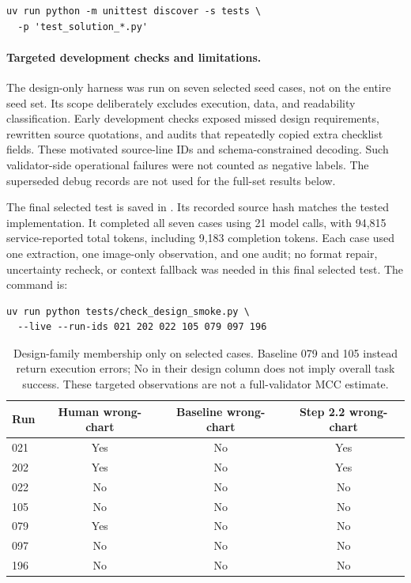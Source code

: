 \documentclass[11pt]{article}
\begin{document}
\begin{verbatim}
uv run python -m unittest discover -s tests \
  -p 'test_solution_*.py'
\end{verbatim}

\paragraph{Targeted development checks and limitations.}
The design-only harness  was run on seven
selected seed cases, not on the entire seed set. Its scope deliberately
excludes execution, data, and readability classification.
Early development checks exposed missed design requirements, rewritten source
quotations, and audits that repeatedly copied extra checklist fields.
These motivated source-line IDs and schema-constrained decoding.
Such validator-side operational failures were not counted as negative labels.
The superseded debug records are not used for the full-set results below.

The final selected test is saved in
.
Its recorded source hash matches the tested implementation.
It completed all seven cases using 21 model calls, with 94,815 service-reported
total tokens, including 9,183 completion tokens.
Each case used one extraction, one image-only observation, and one audit;
no format repair, uncertainty recheck, or context fallback was needed in this
final selected test. The command is:
\begin{verbatim}
uv run python tests/check_design_smoke.py \
  --live --run-ids 021 202 022 105 079 097 196
\end{verbatim}

\begin{table}[htbp]
\centering
\small
\begin{tabular}{lccc}
\toprule
Run & Human wrong-chart & Baseline wrong-chart & Step 2.2 wrong-chart \\
\midrule
021 & Yes & No & Yes \\
202 & Yes & No & Yes \\
022 & No  & No & No  \\
105 & No  & No & No  \\
079 & Yes & No & No  \\
097 & No  & No & No  \\
196 & No  & No & No  \\
\bottomrule
\end{tabular}
\caption{Design-family membership only on selected cases.
Baseline 079 and 105 instead return execution errors; No in their
design column does not imply overall task success.
These targeted observations are not a full-validator MCC estimate.}
\label{tab:design-smoke}
\end{table}
\end{document}
